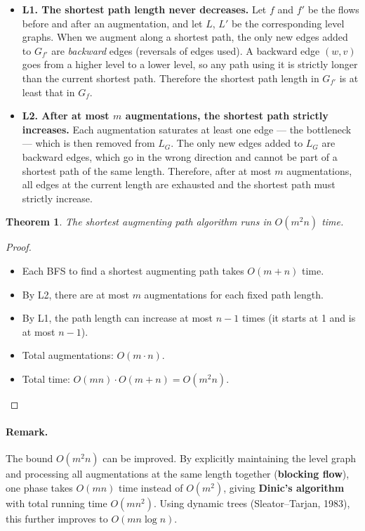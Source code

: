 \documentclass[12pt,a4paper]{report}
\newtheorem{theorem}{Theorem}
\begin{document}
\begin{itemize}
    \item \textbf{L1. The shortest path length never decreases.}
    Let $f$ and $f'$ be the flows before and after an augmentation, and
    let $L$, $L'$ be the corresponding level graphs. When we augment along
    a shortest path, the only new edges added to $G_{f'}$ are
    \emph{backward} edges (reversals of edges used). A backward edge
    $(w, v)$ goes from a higher level to a lower level, so any path using
    it is strictly longer than the current shortest path. Therefore the
    shortest path length in $G_{f'}$ is at least that in $G_f$.

    \item \textbf{L2. After at most $m$ augmentations, the shortest path
    strictly increases.}
    Each augmentation saturates at least one edge --- the bottleneck ---
    which is then removed from $L_G$. The only new edges added to $L_G$
    are backward edges, which go in the wrong direction and cannot be part
    of a shortest path of the same length. Therefore, after at most $m$
    augmentations, all edges at the current length are exhausted and the
    shortest path must strictly increase.
\end{itemize}

\begin{theorem}
The shortest augmenting path algorithm runs in $O(m^2 n)$ time.
\end{theorem}

\begin{proof}
\begin{itemize}
    \item Each BFS to find a shortest augmenting path takes $O(m + n)$
    time.
    \item By L2, there are at most $m$ augmentations for each fixed path
    length.
    \item By L1, the path length can increase at most $n - 1$ times
    (it starts at 1 and is at most $n - 1$).
    \item Total augmentations: $O(m \cdot n)$.
    \item Total time: $O(mn) \cdot O(m + n) = O(m^2 n)$.
\end{itemize}
\end{proof}

\paragraph{Remark.}
The bound $O(m^2 n)$ can be improved. By explicitly maintaining the level
graph and processing all augmentations at the same length together
(\textbf{blocking flow}), one phase takes $O(mn)$ time instead of $O(m^2)$,
giving \textbf{Dinic's algorithm} with total running time $O(mn^2)$.
Using dynamic trees (Sleator--Tarjan, 1983), this further improves to
$O(mn \log n)$.
\end{document}
